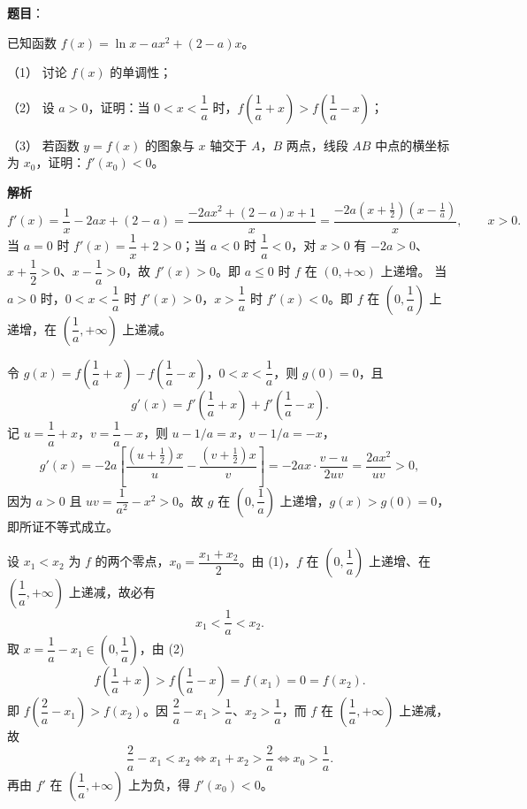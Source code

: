\begin{answer}

\textbf{题目}：

已知函数 $f(x)=\ln x-ax^2+(2-a)x$。

（1） 讨论 $f(x)$ 的单调性；

（2） 设 $a>0$，证明：当 $0<x<\dfrac1a$ 时，$f\left(\dfrac1a+x\right)>f\left(\dfrac1a-x\right)$；

（3） 若函数 $y=f(x)$ 的图象与 $x$ 轴交于 $A$，$B$ 两点，线段 $AB$ 中点的横坐标为 $x_0$，证明：$f'(x_0)<0$。

\textbf{解析}
\nopagebreak[4]
\[f'(x)=\frac1x-2ax+(2-a)=\frac{-2ax^2+(2-a)x+1}{x}
=\frac{-2a\left(x+\frac12\right)\left(x-\frac1a\right)}{x},\qquad x>0.\]
当 $a=0$ 时 $f'(x)=\dfrac1x+2>0$；当 $a<0$ 时 $\dfrac1a<0$，对 $x>0$ 有 $-2a>0$、$x+\dfrac12>0$、$x-\dfrac1a>0$，故 $f'(x)>0$。即 $a\leqslant0$ 时 $f$ 在 $(0,+\infty)$ 上递增。
当 $a>0$ 时，$0<x<\dfrac1a$ 时 $f'(x)>0$，$x>\dfrac1a$ 时 $f'(x)<0$。即 $f$ 在 $\left(0,\dfrac1a\right)$ 上递增，在 $\left(\dfrac1a,+\infty\right)$ 上递减。

令 $g(x)=f\left(\dfrac1a+x\right)-f\left(\dfrac1a-x\right)$，$0<x<\dfrac1a$，则 $g(0)=0$，且
\nopagebreak[4]
\[g'(x)=f'\left(\frac1a+x\right)+f'\left(\frac1a-x\right).\]
记 $u=\dfrac1a+x$，$v=\dfrac1a-x$，则 $u-1/a=x$，$v-1/a=-x$，
\nopagebreak[4]
\[g'(x)=-2a\left[\frac{\left(u+\frac12\right)x}{u}-\frac{\left(v+\frac12\right)x}{v}\right]
=-2ax\cdot\frac{v-u}{2uv}=\frac{2ax^2}{uv}>0,\]
因为 $a>0$ 且 $uv=\dfrac1{a^2}-x^2>0$。故 $g$ 在 $\left(0,\dfrac1a\right)$ 上递增，$g(x)>g(0)=0$，即所证不等式成立。

设 $x_1<x_2$ 为 $f$ 的两个零点，$x_0=\dfrac{x_1+x_2}2$。由 (1)，$f$ 在 $\left(0,\dfrac1a\right)$ 上递增、在 $\left(\dfrac1a,+\infty\right)$ 上递减，故必有
\nopagebreak[4]
\[x_1<\frac1a<x_2.\]
取 $x=\dfrac1a-x_1\in\left(0,\dfrac1a\right)$，由 (2)
\nopagebreak[4]
\[f\left(\frac1a+x\right)>f\left(\frac1a-x\right)=f(x_1)=0=f(x_2).\]
即 $f\left(\dfrac2a-x_1\right)>f(x_2)$。因 $\dfrac2a-x_1>\dfrac1a$、$x_2>\dfrac1a$，而 $f$ 在 $\left(\dfrac1a,+\infty\right)$ 上递减，故
\nopagebreak[4]
\[\frac2a-x_1<x_2\Longleftrightarrow x_1+x_2>\frac2a\Longleftrightarrow x_0>\frac1a.\]
再由 $f'$ 在 $\left(\dfrac1a,+\infty\right)$ 上为负，得 $f'(x_0)<0$。




\end{answer}
